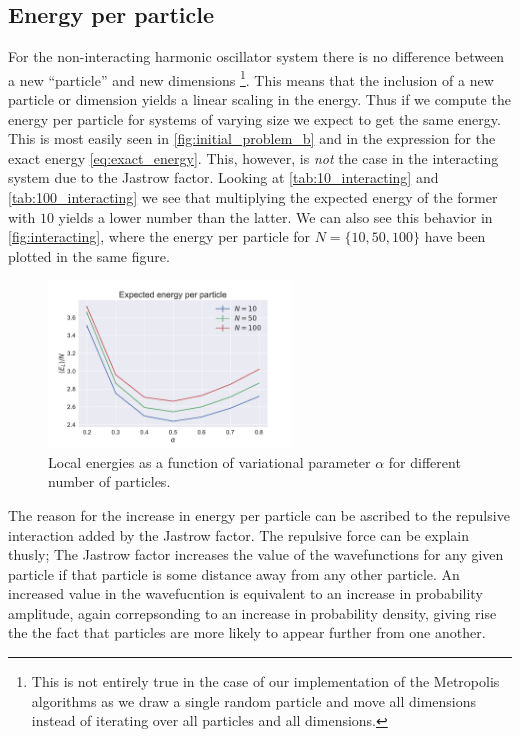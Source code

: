 \documentclass[
    a4paper, aps, twocolumn, floatfix, superscriptaddress,
    nofootinbib]{revtex4-1}
\newcommand{\1}{\mathds{1}}
\begin{document}
	\subsection{Energy per particle}
        For the non-interacting harmonic oscillator system there is no
        difference between a new ``particle'' and new dimensions
        \footnote{This is not entirely true in the case of our implementation of
        the Metropolis algorithms as we draw a single random particle and move
        all dimensions instead of iterating over all particles and all
        dimensions.}. This means that the inclusion of a new particle or
        dimension yields a linear scaling in the energy. Thus if we compute the
        energy per particle for systems of varying size we expect to get the
        same energy. This is most easily seen in \autoref{fig:initial_problem_b}
        and in the expression for the exact energy \autoref{eq:exact_energy}.
        This, however, is \emph{not} the case in the interacting system due to
        the Jastrow factor. Looking at \autoref{tab:10_interacting} and
        \autoref{tab:100_interacting} we see that multiplying the expected
        energy of the former with $10$ yields a lower number than the latter. We
        can also see this behavior in \autoref{fig:interacting}, where the
        energy per particle for $N = \{10, 50, 100\}$ have been plotted in the
        same figure.

        \begin{figure}
            \includegraphics[width=244px]{../data/figures/problem_e.pdf}
            \caption{Local energies as a function of variational parameter
            $\alpha$ for different number of particles.}
            \label{fig:interacting}
        \end{figure}
        
        The reason for the increase in energy per particle can be ascribed to the
        repulsive interaction added by the Jastrow factor. The repulsive force can
        be explain thusly; The Jastrow factor  increases the value of the 
        wavefunctions for any given particle if that particle is some distance away
         from any other particle. An increased value in the wavefucntion is equivalent
         to an increase in probability amplitude, again correpsonding to an increase in
         probability density, giving rise the the fact that particles are more likely to 
         appear further from one another. 
         
\end{document}
